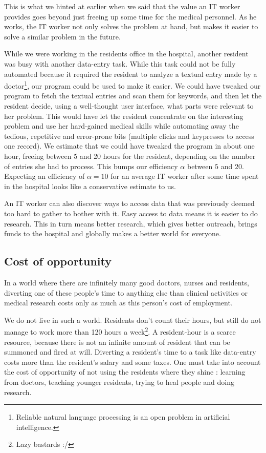 \documentclass[nobib]{tufte-handout}
\begin{document}
This is what we hinted at earlier when we said that the value an IT worker provides goes beyond just freeing up some time for the medical personnel. As he works, the IT worker not only solves the problem at hand, but makes it easier to solve a similar problem in the future.

While we were working in the residents office in the hospital, another resident was busy with another data-entry task. While this task could not be fully automated because it required the resident to analyze a textual entry made by a doctor\footnote{Reliable natural language processing is an open problem in artificial intelligence.}, our program could be used to make it easier. We could have tweaked our program to fetch the textual entries and scan them for keywords, and then let the resident decide, using a well-thought user interface, what parts were relevant to her problem. This would have let the resident concentrate on the interesting problem and use her hard-gained medical skills while automating away the tedious, repetitive and error-prone bits (multiple clicks and keypresses to access one record). We estimate that we could have tweaked the program in about one hour, freeing between 5 and 20 hours for the resident, depending on the number of entries she had to process. This bumps our efficiency $\alpha$ between $5$ and $20$. Expecting an efficiency of $\alpha=10$ for an average IT worker after some time spent in the hospital looks like  a conservative estimate to us.

An IT worker can also discover ways to access data that was previously deemed too hard to gather to bother with it. Easy access to data means it is easier to do research. This in turn means better research, which gives better outreach, brings funds to the hospital and globally makes a better world for everyone. 

\subsection{Cost of opportunity}

In a world where there are infinitely many good doctors, nurses and residents, diverting one of these people's time to anything else than clinical activities or medical research costs only as much as this person's cost of employment.

We do not live in such a world. Residents don't count their hours, but still do not manage to work more
than 120 hours a week\footnote{Lazy bastards :/}. A resident-hour is a scarce resource, because there is not an infinite amount of resident that can be summoned and fired at will. Diverting a resident's time to a task like data-entry costs more than the resident's salary and some taxes. One must take into account the cost of opportunity of not using the residents where they shine : learning from doctors, teaching younger residents, trying to heal people and doing research.
\end{document}
